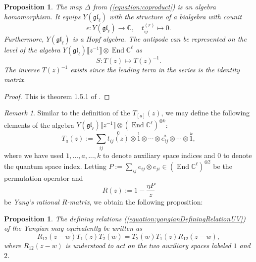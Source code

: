 \documentclass[11pt]{report}
\newtheorem{prop}[theorem]{Proposition}
\theoremstyle{definition}
\theoremstyle{remark}
\newtheorem*{remark}{Remark}
\theoremstyle{remark}
\newcommand{\End}{\operatorname{End}}
\newcommand{\C}{\mathbb{C}}
\begin{document}
\begin{prop}
The map $\Delta$ from (\ref{equation:coproduct}) is an algebra homomorphism. It equips $Y(\mathfrak{gl}_\ell)$ with the structure of a bialgebra with counit
\begin{equation*}
\epsilon: Y(\mathfrak{gl}_\ell) \to \C, \quad t_{ij}^{(r)} \mapsto 0.
\end{equation*}
Furthermore, $Y(\mathfrak{gl}_\ell)$ is a Hopf algebra. The antipode can be represented on the level of the algebra $Y(\mathfrak{gl}_\ell)\llbracket z^{-1} \rrbracket \otimes \End \C^\ell$ as
\begin{equation*}
S: T(z) \mapsto T(z)^{-1}.
\end{equation*}
The inverse $T(z)^{-1}$ exists since the leading term in the series is the identity matrix.
\end{prop}

\begin{proof}
This is theorem 1.5.1 of \cite{book:molev}.
\end{proof}

\begin{remark}
Similar to the definition of the $T_{[a]}(z)$, we may define the following elements of the algebra $Y(\mathfrak{gl}_\ell)\llbracket z^{-1} \rrbracket \otimes (\End \C^\ell)^{\otimes k}$:
\begin{equation*}
T_a(z) := \sum_{ij} \overset{0}{t_{ij}(z)} \otimes \overset{1}{1} \otimes \cdots \otimes \overset{a}{e_{ij}} \otimes \cdots \otimes \overset{k}{1},
\end{equation*}
where we have used $1,...,a,...,k$ to denote auxiliary space indices and $0$ to denote the quantum space index. Letting $P := \sum_{ij} e_{ij} \otimes e_{ji} \in (\End \C^\ell)^{\otimes 2}$ be the permutation operator and
\begin{equation*}
R(z) := 1 - \frac{\eta P}{z}
\end{equation*}
be \emph{Yang's rational $R$-matrix}, we obtain the following proposition:
\end{remark}

\begin{prop}
The defining relations (\ref{equation:yangianDefiningRelationUV}) of the Yangian may equivalently be written as
\begin{equation}\label{equation:RTTRelation}
R_{12}(z-w) T_1(z) T_2(w) = T_2(w) T_1(z) R_{12}(z-w),
\end{equation}
where $R_{12}(z-w)$ is understood to act on the two auxiliary spaces labeled $1$ and $2$.
\end{prop}
\end{document}
